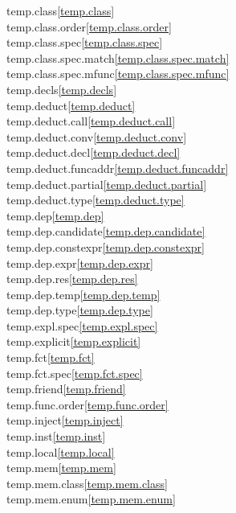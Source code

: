 \begin{multicols}{2}
temp.class\quad\ref{temp.class}\\
temp.class.order\quad\ref{temp.class.order}\\
temp.class.spec\quad\ref{temp.class.spec}\\
temp.class.spec.match\quad\ref{temp.class.spec.match}\\
temp.class.spec.mfunc\quad\ref{temp.class.spec.mfunc}\\
temp.decls\quad\ref{temp.decls}\\
temp.deduct\quad\ref{temp.deduct}\\
temp.deduct.call\quad\ref{temp.deduct.call}\\
temp.deduct.conv\quad\ref{temp.deduct.conv}\\
temp.deduct.decl\quad\ref{temp.deduct.decl}\\
temp.deduct.funcaddr\quad\ref{temp.deduct.funcaddr}\\
temp.deduct.partial\quad\ref{temp.deduct.partial}\\
temp.deduct.type\quad\ref{temp.deduct.type}\\
temp.dep\quad\ref{temp.dep}\\
temp.dep.candidate\quad\ref{temp.dep.candidate}\\
temp.dep.constexpr\quad\ref{temp.dep.constexpr}\\
temp.dep.expr\quad\ref{temp.dep.expr}\\
temp.dep.res\quad\ref{temp.dep.res}\\
temp.dep.temp\quad\ref{temp.dep.temp}\\
temp.dep.type\quad\ref{temp.dep.type}\\
temp.expl.spec\quad\ref{temp.expl.spec}\\
temp.explicit\quad\ref{temp.explicit}\\
temp.fct\quad\ref{temp.fct}\\
temp.fct.spec\quad\ref{temp.fct.spec}\\
temp.friend\quad\ref{temp.friend}\\
temp.func.order\quad\ref{temp.func.order}\\
temp.inject\quad\ref{temp.inject}\\
temp.inst\quad\ref{temp.inst}\\
temp.local\quad\ref{temp.local}\\
temp.mem\quad\ref{temp.mem}\\
temp.mem.class\quad\ref{temp.mem.class}\\
temp.mem.enum\quad\ref{temp.mem.enum}\\

\end{multicols}
